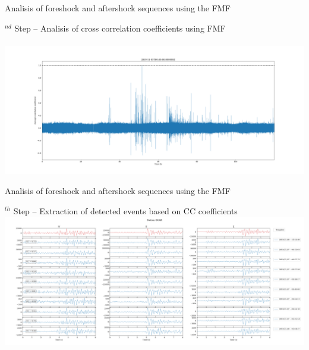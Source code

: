 \documentclass[aspectratio=43,9pt]{beamer}
\begin{document}
\begin{frame}{Analisis of foreshock and aftershock sequences using the FMF}

  \hskip -1.5cm \begin{minipage}{1\linewidth}
    $^{nd}$ Step -- Analisis of cross correlation coefficients using FMF \\ \citep{Beauce_2017_FMF} \\
    \vskip 0.2cm
    \centering \includegraphics[width=1.2\linewidth]{figs/3_ml_2p5_2019-11-07_correlation_coefficients}
  \end{minipage}

\end{frame}


\begin{frame}{Analisis of foreshock and aftershock sequences using the FMF}

  \hskip -1.1cm \begin{minipage}{1\linewidth}
    $^{th}$ Step -- Extraction of detected events based on CC coefficients \\
    \vskip 0.4cm
    \centering \includegraphics[width=1.15\linewidth]{figs/4_ml_2p5_2019-11-07_new_detections}
  \end{minipage}

\end{frame}
\end{document}
